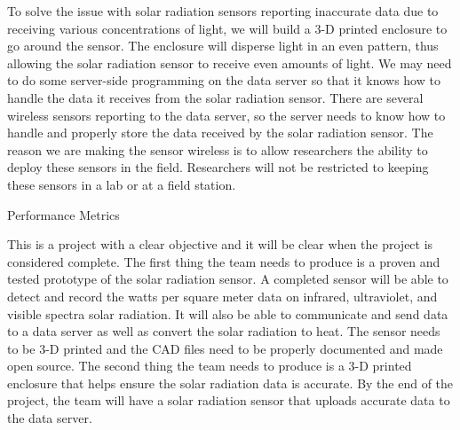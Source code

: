 \documentclass[10pt,draftclsnofoot,onecolumn,letterpaper]{article}
\begin{document}
    {\fontsize{10pt}{12.0pt}\selectfont To solve the issue with solar radiation sensors reporting inaccurate data due to receiving various concentrations of light, we will build a 3-D printed enclosure to go around the sensor. The enclosure will disperse light in an even pattern, thus allowing the solar radiation sensor to receive even amounts of light. We may need to do some server-side programming on the data server so that it knows how to handle the data it receives from the solar radiation sensor. There are several wireless sensors reporting to the data server, so the server needs to know how to handle and properly store the data received by the solar radiation sensor. The reason we are making the sensor wireless is to allow researchers the ability to deploy these sensors in the field. Researchers will not be restricted to keeping these sensors in a lab or at a field station.\par}\par
    
    
    \vspace{\baselineskip}
    \begin{Center}
    {\fontsize{14pt}{16.8pt}\selectfont Performance Metrics\par}
    \end{Center}\par
    
    {\fontsize{10pt}{12.0pt}\selectfont This is a project with a clear objective and it will be clear when the project is considered complete. The first thing the team needs to produce is a proven and tested prototype of the solar radiation sensor. A completed sensor will be able to detect and record the watts per square meter data on infrared, ultraviolet, and visible spectra solar radiation. It will also be able to communicate and send data to a data server as well as convert the solar radiation to heat. The sensor needs to be 3-D printed and the CAD files need to be properly documented and made open source. The second thing the team needs to produce is a 3-D printed enclosure that helps ensure the solar radiation data is accurate. By the end of the project, the team will have a solar radiation sensor that uploads accurate data to the data server.\par}\par
    
    
\end{document}
